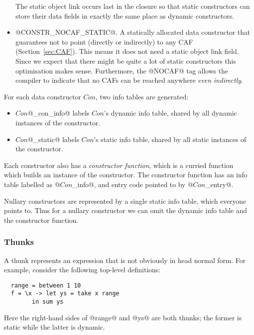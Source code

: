 \documentclass[11pt]{article}
\newcommand{\secref}[1]{Section~\ref{sec:#1}}
\begin{document}
\begin{itemize}
The static object link occurs last in the closure so that static
constructors can store their data fields in exactly the same place as
dynamic constructors.

\item @CONSTR_NOCAF_STATIC@.  A statically allocated data constructor
that guarantees not to point (directly or indirectly) to any CAF
(\secref{CAF}).  This means it does not need a static object
link field.  Since we expect that there might be quite a lot of static
constructors this optimisation makes sense.  Furthermore, the @NOCAF@
tag allows the compiler to indicate that no CAFs can be reached
anywhere \emph{even indirectly}.

\end{itemize}

For each data constructor $Con$, two info tables are generated:

\begin{itemize}
\item $Con$@_con_info@ labels $Con$'s dynamic info table, 
shared by all dynamic instances of the constructor.
\item $Con$@_static@ labels $Con$'s static info table, 
shared by all static instances of the constructor.
\end{itemize}

Each constructor also has a \emph{constructor function}, which is a
curried function which builds an instance of the constructor.  The
constructor function has an info table labelled as @$Con$_info@, and
entry code pointed to by @$Con$_entry@.

Nullary constructors are represented by a single static info table,
which everyone points to.  Thus for a nullary constructor we can omit
the dynamic info table and the constructor function.

\subsubsection{Thunks}
\label{sec:THUNK}
\label{sec:THUNK_SELECTOR}

A thunk represents an expression that is not obviously in head normal 
form.  For example, consider the following top-level definitions:
\begin{verbatim}
  range = between 1 10
  f = \x -> let ys = take x range
	    in sum ys
\end{verbatim}
Here the right-hand sides of @range@ and @ys@ are both thunks; the former
is static while the latter is dynamic.
\end{document}
